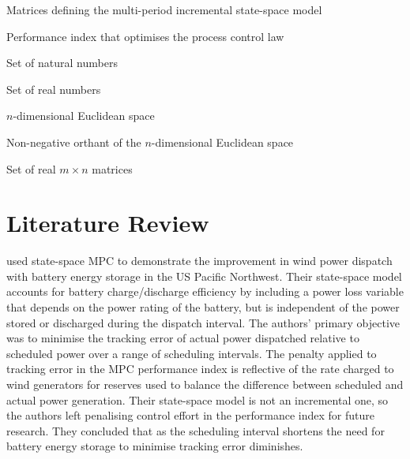 \begin{description}[before={\renewcommand\makelabel[1]{\normalfont ##1}}, itemsep=5pt, leftmargin=0.0cm, labelwidth=2.0cm]
	\item[$K, L$]  Matrices defining the multi-period incremental state-space model
	\item[$f$]  Performance index that optimises the process control law
	\item[$\N$]  Set of natural numbers
	\item[$\R$]  Set of real numbers
	\item[$\R^{n}$]  $n$-dimensional Euclidean space
	\item[$\R_{+}^{n}$]  Non-negative orthant of the $n$-dimensional Euclidean space
	\item[$\R^{m \times n}$]  Set of real $m \times n$ matrices
\end{description}

\section{Literature Review}\label{sect:lit_review}

\citet{HALBB14} used state-space MPC to demonstrate the improvement in wind power dispatch with battery energy storage in the US Pacific Northwest.  Their state-space model accounts for battery charge/discharge efficiency by including a power loss variable that depends on the power rating of the battery, but is independent of the power stored or discharged during the dispatch interval.  The authors' primary objective was to minimise the tracking error of actual power dispatched relative to scheduled power over a range of scheduling intervals.  The penalty applied to tracking error in the MPC performance index is reflective of the rate charged to wind generators for reserves used to balance the difference between scheduled and actual power generation.  Their state-space model is not an incremental one, so the authors left penalising control effort in the performance index for future research.  They concluded that as the scheduling interval shortens the need for battery energy storage to minimise tracking error diminishes.

